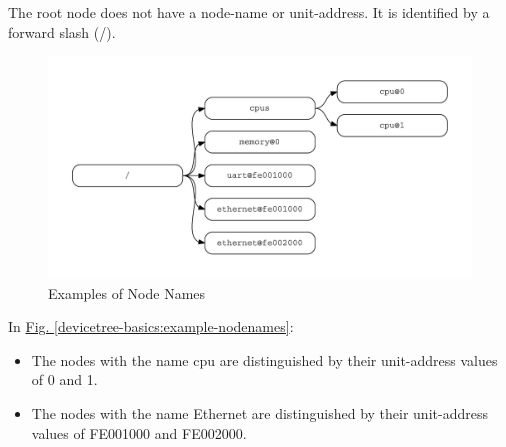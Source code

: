 \documentclass[a4paper,10pt,oneside]{sphinxmanual}
\begin{document}
The root node does not have a node-name or unit-address. It is
identified by a forward slash (/).
\begin{figure}[htbp]
\centering
\capstart

\includegraphics{graphviz-8bc6c34d442f7e613c5d327992e204083ddaf50f.pdf}
\caption{Examples of Node Names}\label{devicetree-basics:example-nodenames}\label{devicetree-basics:id5}\end{figure}

In \hyperref[devicetree-basics:example-nodenames]{Fig. \ref{devicetree-basics:example-nodenames}}:
\begin{itemize}
\item {} 
The nodes with the name cpu are distinguished by their unit-address
values of 0 and 1.

\item {} 
The nodes with the name Ethernet are distinguished by their
unit-address values of FE001000 and FE002000.

\end{itemize}
\end{document}
